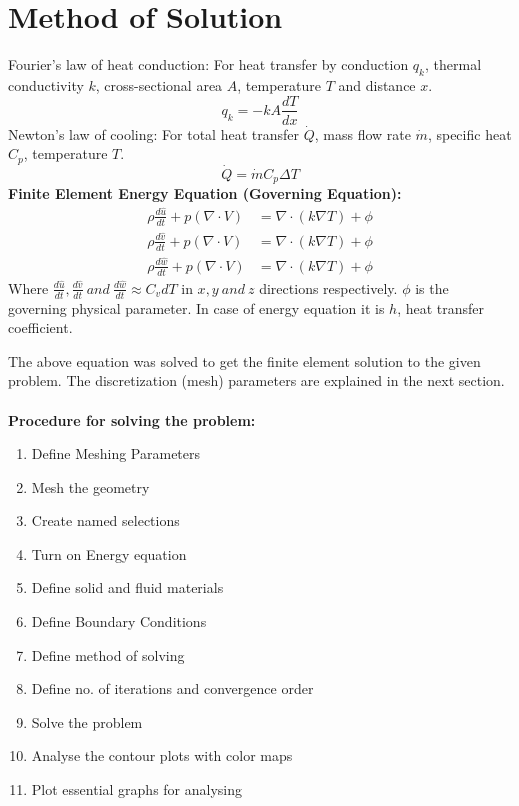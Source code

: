 \documentclass[twoside]{article}
\begin{document}
\section{Method of Solution}
    Fourier's law of heat conduction: For heat transfer by conduction $q_k$, thermal conductivity $k$, cross-sectional area $A$, temperature $T$ and distance $x$.
    $$q_k = -kA\frac{dT}{dx}$$
    Newton's law of cooling: For total heat transfer $\dot{Q}$, mass flow rate $\dot{m}$, specific heat $C_p$, temperature $T$.
    $$\dot{Q}=\dot{m}C_p\Delta T $$
    \textbf{Finite Element Energy Equation (Governing Equation): }
    \begin{align*}
        \rho \frac{d\hat{u}}{dt}+p(\nabla \cdot V) &= \nabla\cdot(k\nabla T)+\phi\\
        \rho \frac{d\hat{v}}{dt}+p(\nabla \cdot V) &= \nabla\cdot(k\nabla T)+\phi\\
        \rho \frac{d\hat{w}}{dt}+p(\nabla \cdot V) &= \nabla\cdot(k\nabla T)+\phi
    \end{align*}
    Where $\frac{d\hat{u}}{dt},\frac{d\hat{v}}{dt}\ and\ \frac{d\hat{w}}{dt} \approx C_vdT$  in $x,y\ and\ z$ directions respectively. $\phi$ is the governing physical parameter. In case of energy equation it is $h$, heat transfer coefficient. 
    
    The above equation was solved to get the finite element solution to the given problem. The discretization (mesh) parameters are explained in the next section. \\
    \vspace{1.5cm}\\
    \textbf{Procedure for solving the problem:}
    \begin{enumerate}
        \item Define Meshing Parameters
        \item Mesh the geometry
        \item Create named selections
        \item Turn on Energy equation
        \item Define solid and fluid materials
        \item Define Boundary Conditions
        \item Define method of solving 
        \item Define no. of iterations and convergence order
        \item Solve the problem
        \item Analyse the contour plots with color maps
        \item Plot essential graphs for analysing 
    \end{enumerate}
\newpage
\end{document}
